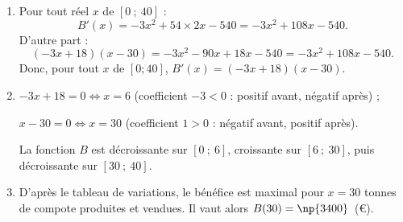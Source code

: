 \begin{enumerate}
	\item Pour tout réel $x$ de $[0~;~40]$ :
	\[B'(x) = -3x^2 + 54 \times 2x - 540 = -3x^2 + 108x - 540.\]
	D'autre part :
	\[(-3x+18)(x-30) = -3x^2 - 90x + 18x - 540 = -3x^2 + 108x - 540.\]
	Donc, pour tout $x$ de $[0 ; 40]$, $B'(x) = (-3x+18)(x-30)$.

	\item $-3x + 18 = 0 \iff x = 6$ (coefficient $-3 < 0$ : positif avant, négatif après) ;

	$x - 30 = 0 \iff x = 30$ (coefficient $1 > 0$ : négatif avant, positif après).

	\begin{center}
	\end{center}

La fonction $B$ est décroissante sur $[0~;~6]$, croissante sur
	$[6~;~30]$, puis décroissante sur $[30~;~40]$.

	\item D'après le tableau de variations, le bénéfice est maximal pour $x = 30$ tonnes de compote produites et vendues. Il vaut alors $B(30) = \np{3400}$~(\euro).
\end{enumerate}

\medskip

